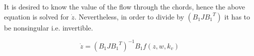 It is desired to know the value of the flow through the chords, hence the above equation is solved 
for $\dot{z}$. Nevertheless, in order to divide by $(B_1 J {B_1}^T)$ it has to be nonsingular i.e. invertible. 

%
%


\begin{equation}
   \dot{z}  = (B_1 J {B_1}^T)^{-1}B_1 f(z, w, k_v)
   \label{ParatModelFinal}
 \end{equation}


